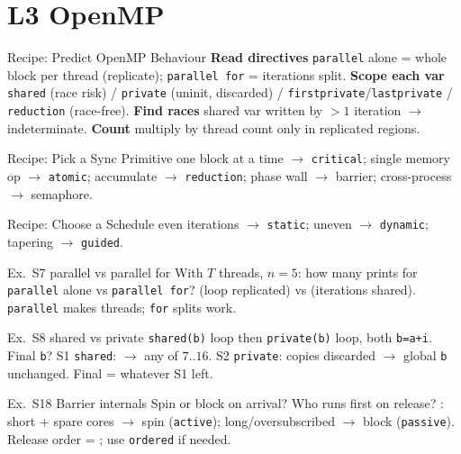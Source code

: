 \section{L3 OpenMP}

\begin{KR}{Recipe: Predict OpenMP Behaviour}
    \textbf{Read directives} \texttt{parallel} alone = whole block per thread (replicate); \texttt{parallel for} = iterations split.
    \textbf{Scope each var} \texttt{shared} (race risk) / \texttt{private} (uninit, discarded) / \texttt{firstprivate}/\texttt{lastprivate} / \texttt{reduction} (race-free).
    \textbf{Find races} shared var written by $>1$ iteration $\to$ indeterminate.
    \textbf{Count} multiply by thread count only in replicated regions.
\end{KR}

\begin{KR}{Recipe: Pick a Sync Primitive}
    one block at a time $\to$ \texttt{critical}; single memory op $\to$ \texttt{atomic}; accumulate $\to$ \texttt{reduction}; phase wall $\to$ barrier; cross-process $\to$ semaphore.
\end{KR}

\begin{KR}{Recipe: Choose a Schedule}
    even iterations $\to$ \texttt{static}; uneven $\to$ \texttt{dynamic}; tapering $\to$ \texttt{guided}.
\end{KR}

\begin{example2}{Ex.\ S7 parallel vs parallel for}
    With $T$ threads, $n=5$: how many prints for \texttt{parallel} alone vs \texttt{parallel for}?
    \tcblower
     (loop replicated) vs  (iterations shared). \texttt{parallel} makes threads; \texttt{for} splits work.
\end{example2}

\begin{example2}{Ex.\ S8 shared vs private}
    \texttt{shared(b)} loop then \texttt{private(b)} loop, both \texttt{b=a+i}. Final \texttt{b}?
    \tcblower
    S1 \texttt{shared}:  $\to$ any of $7..16$. S2 \texttt{private}: copies discarded $\to$ global \texttt{b} unchanged. Final = whatever S1 left.
\end{example2}

\begin{example2}{Ex.\ S18 Barrier internals}
    Spin or block on arrival? Who runs first on release?
    \tcblower
    : short + spare cores $\to$ spin (\texttt{active}); long/oversubscribed $\to$ block (\texttt{passive}). Release order = ; use \texttt{ordered} if needed.
\end{example2}

